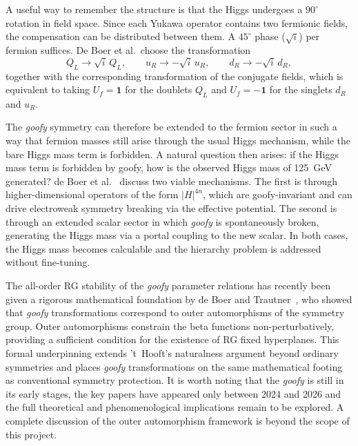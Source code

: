 \documentclass[a4paper, 11pt]{article}
\begin{document}
A useful way to remember the structure is that the Higgs undergoes a $90^\circ$ rotation in field space. Since each Yukawa operator contains two fermionic fields, the compensation can be distributed between them. A $45^\circ$ phase ($\sqrt{i}$) per fermion suffices. De Boer et al.\ choose the transformation~\cite{goofy2}
\begin{equation*}
    Q_L \rightarrow \sqrt{i}\,Q_L,
    \qquad
    u_R \rightarrow -\sqrt{i}\,u_R,
    \qquad
    d_R \rightarrow -\sqrt{i}\,d_R,
    \label{eq:yukawa_param}
\end{equation*}
together with the corresponding transformation of the conjugate fields, which is equivalent to taking $U_f=\mathbf{1}$ for the doublets $Q_L$ and $U_f=-\mathbf{1}$ for the singlets $d_R$ and $u_R$.

The \textit{goofy} symmetry can therefore be extended to the fermion sector in such a way that fermion masses still arise through the usual Higgs mechanism, while the bare Higgs mass term is forbidden. A natural question then arises: if the Higgs mass term is forbidden by goofy, how is the observed Higgs mass of 125~GeV generated? de Boer et al.~\cite{goofy2} discuss two viable mechanisms. The first is through higher-dimensional operators of the form $|H|^{4n}$, which are goofy-invariant and can drive electroweak symmetry breaking via the effective potential. The second is through an extended scalar sector in which \textit{goofy} is spontaneously broken, generating the Higgs mass via a portal coupling to the new scalar. In both cases, the Higgs mass becomes calculable and the hierarchy problem is addressed without fine-tuning.

The all-order RG stability of the \textit{goofy} parameter relations has recently been given a rigorous mathematical foundation by de Boer and Trautner~\cite{deBoer_Trautner_Outs}, who showed that \textit{goofy} transformations correspond to outer automorphisms of the symmetry group. Outer automorphisms constrain the beta functions non-perturbatively, providing a sufficient condition for the existence of RG fixed hyperplanes. This formal underpinning extends 't~Hooft's naturalness argument beyond ordinary symmetries and places \textit{goofy} transformations on the same mathematical footing as conventional symmetry protection. It is worth noting that the \textit{goofy} is still in its early stages, the key papers have appeared only between 2024 and 2026 and the full theoretical and phenomenological implications remain to be explored. A complete discussion of the outer automorphism framework is beyond the scope of this project.
\end{document}
